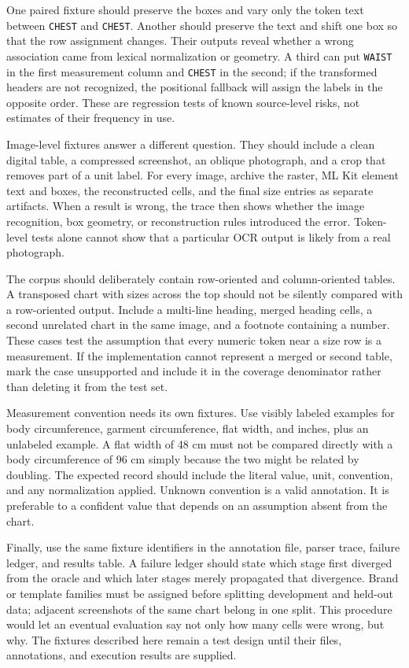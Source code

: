 \documentclass[10pt,letterpaper]{article}
\begin{document}
One paired fixture should preserve the boxes and vary only the token text between \texttt{CHEST} and \texttt{CHE5T}. Another should preserve the text and shift one box so that the row assignment changes. Their outputs reveal whether a wrong association came from lexical normalization or geometry. A third can put \texttt{WAIST} in the first measurement column and \texttt{CHEST} in the second; if the transformed headers are not recognized, the positional fallback will assign the labels in the opposite order. These are regression tests of known source-level risks, not estimates of their frequency in use.

Image-level fixtures answer a different question. They should include a clean digital table, a compressed screenshot, an oblique photograph, and a crop that removes part of a unit label. For every image, archive the raster, ML Kit element text and boxes, the reconstructed cells, and the final size entries as separate artifacts. When a result is wrong, the trace then shows whether the image recognition, box geometry, or reconstruction rules introduced the error. Token-level tests alone cannot show that a particular OCR output is likely from a real photograph.

The corpus should deliberately contain row-oriented and column-oriented tables. A transposed chart with sizes across the top should not be silently compared with a row-oriented output. Include a multi-line heading, merged heading cells, a second unrelated chart in the same image, and a footnote containing a number. These cases test the assumption that every numeric token near a size row is a measurement. If the implementation cannot represent a merged or second table, mark the case unsupported and include it in the coverage denominator rather than deleting it from the test set.

Measurement convention needs its own fixtures. Use visibly labeled examples for body circumference, garment circumference, flat width, and inches, plus an unlabeled example. A flat width of 48 cm must not be compared directly with a body circumference of 96 cm simply because the two might be related by doubling. The expected record should include the literal value, unit, convention, and any normalization applied. Unknown convention is a valid annotation. It is preferable to a confident value that depends on an assumption absent from the chart.

Finally, use the same fixture identifiers in the annotation file, parser trace, failure ledger, and results table. A failure ledger should state which stage first diverged from the oracle and which later stages merely propagated that divergence. Brand or template families must be assigned before splitting development and held-out data; adjacent screenshots of the same chart belong in one split. This procedure would let an eventual evaluation say not only how many cells were wrong, but why. The fixtures described here remain a test design until their files, annotations, and execution results are supplied.
\end{document}
